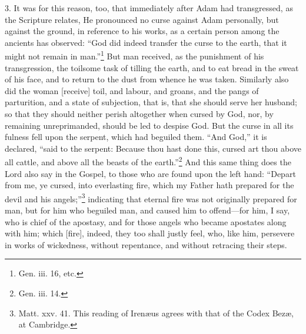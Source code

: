 3. It was for this reason, too, that immediately after Adam had transgressed, as the Scripture relates, He pronounced no curse against Adam personally, but against the ground, in reference to his works, as a certain person among the ancients has observed: “God did indeed transfer the curse to the earth, that it might not remain in man.”\footnote{Gen. iii. 16, etc.} But man received, as the punishment of his transgression, the toilsome task of tilling the earth, and to eat bread in the sweat of his face, and to return to the dust from whence he was taken. Similarly also did the woman [receive] toil, and labour, and groans, and the pangs of parturition, and a state of subjection, that is, that she should serve her husband; so that they should neither perish altogether when cursed by God, nor, by remaining unreprimanded, should be led to despise God. But the curse in all its fulness fell upon the serpent, which had beguiled them. “And God,” it is declared, “said to the serpent: Because thou hast done this, cursed art thou above all cattle, and above all the beasts of the earth.”\footnote{Gen. iii. 14.} And this same thing does the Lord also say in the Gospel, to those who are found upon the left hand: “Depart from me, ye cursed, into everlasting fire, which my Father hath prepared for the devil and his angels;”\footnote{Matt. xxv. 41. This reading of Irenæus agrees with that of the Codex Bezæ, at Cambridge.} indicating that eternal fire was not originally prepared for man, but for him who beguiled man, and caused him to offend—for him, I say, who is chief of the apostasy, and for those angels who became apostates along with him; which [fire], indeed, they too shall justly feel, who, like him, persevere in works of wickedness, without repentance, and without retracing their steps.

